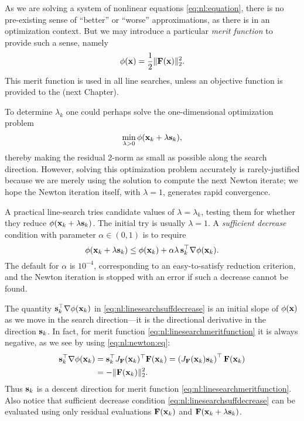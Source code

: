 As we are solving a system of nonlinear equations \eqref{eq:nl:equation}, there is no pre-existing sense of ``better'' or ``worse'' approximations, as there is in an optimization context.  But we may introduce a particular \emph{merit function} \citep{NocedalWright2006} to provide such a sense, namely
\begin{equation}
\phi(\mathbf{x}) = \frac{1}{2} \|\mathbf{F}(\mathbf{x})\|_2^2.  \label{eq:nl:linesearchmeritfunction}
\end{equation}
This merit function is used in all \pSNES line searches, unless an objective function is provided to the \pSNES (next Chapter).

To determine $\lambda_k$ one could perhaps solve the one-dimensional optimization problem
\begin{equation}
\min_{\lambda>0} \phi(\mathbf{x}_k + \lambda \mathbf{s}_k),  \label{eq:nl:linesearchperhapsopt}
\end{equation}
thereby making the residual 2-norm as small as possible along the search direction.  However, solving this optimization problem accurately is rarely-justified because we are merely using the solution to compute the next Newton iterate; we hope the Newton iteration itself, with $\lambda=1$, generates rapid convergence.

A practical line-search tries candidate values of $\lambda=\lambda_k$, testing them for whether they reduce $\phi(\mathbf{x}_k + \lambda \mathbf{s}_k)$.  The initial try is usually $\lambda=1$.  A \emph{sufficient  decrease} condition with parameter $\alpha\in(0,1)$ is to require
\begin{equation}
\phi(\mathbf{x}_k + \lambda \mathbf{s}_k) \le \phi(\mathbf{x}_k) + \alpha \lambda\, \mathbf{s}_k^\top \nabla \phi(\mathbf{x}_k).  \label{eq:nl:linesearchsuffdecrease}
\end{equation}
The \PETSc default for $\alpha$ is $10^{-4}$, corresponding to an easy-to-satisfy reduction criterion, and the Newton iteration is stopped with an error if such a decrease cannot be found.

The quantity $\mathbf{s}_k^\top \nabla \phi(\mathbf{x}_k)$ in \eqref{eq:nl:linesearchsuffdecrease} is an initial slope of $\phi(\mathbf{x})$ as we move in the search direction---it is the directional derivative in the direction $\mathbf{s}_k$.  In fact, for merit function \eqref{eq:nl:linesearchmeritfunction} it is always negative, as we see by using \eqref{eq:nl:newton:eq}:
\begin{align}
\mathbf{s}_k^\top \nabla \phi(\mathbf{x}_k) &= \mathbf{s}_k^\top J_{\mathbf{F}}(\mathbf{x}_k)^\top \mathbf{F}(\mathbf{x}_k) = \left(J_{\mathbf{F}}(\mathbf{x}_k) \mathbf{s}_k\right)^\top \mathbf{F}(\mathbf{x}_k) \label{eq:nl:linesearchinitslope} \\
  &= - \|\mathbf{F}(\mathbf{x}_k)\|_2^2. \notag
\end{align}
Thus $\mathbf{s}_k$ is a descent direction for merit function \eqref{eq:nl:linesearchmeritfunction}.  Also notice that sufficient decrease condition \eqref{eq:nl:linesearchsuffdecrease} can be evaluated using only residual evaluations $\mathbf{F}(\mathbf{x}_k)$ and $\mathbf{F}(\mathbf{x}_k + \lambda \mathbf{s}_k)$.

